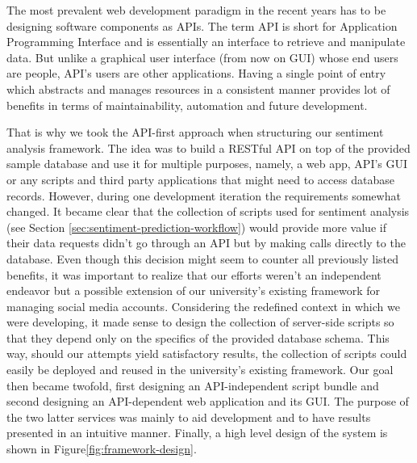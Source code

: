 The most prevalent web development paradigm in the recent years has to be designing software components as APIs. 
The term API is short for Application Programming Interface and is essentially an interface to retrieve and manipulate data. But unlike a graphical user interface (from now on GUI) whose end users are people, API's users are other applications. 
Having a single point of entry which abstracts and manages resources in a consistent manner provides lot of benefits in terms of maintainability, automation and future development.

That is why we took the API-first approach when structuring our sentiment analysis framework. 
The idea was to build a RESTful API on top of the provided sample database and use it for multiple purposes, namely, a web app, API's GUI or any scripts and third party applications that might need to access database records. 
However, during one development iteration the requirements somewhat changed.
It became clear that the collection of scripts used for sentiment analysis (see Section \ref{sec:sentiment-prediction-workflow}) would provide more value if their data requests didn't go through an API but by making calls directly to the database. 
Even though this decision might seem to counter all previously listed benefits, it was important to realize that our efforts weren't an independent endeavor but a possible extension of our university's existing framework for managing social media accounts. 
Considering the redefined context in which we were developing, it made sense to design the collection of server-side scripts so that they depend only on the specifics of the provided database schema.
This way, should our attempts yield satisfactory results, the collection of scripts could easily be deployed and reused in the university's existing framework. 
Our goal then became twofold, first designing an API-independent script bundle and second designing an API-dependent web application and its GUI. 
The purpose of the two latter services was mainly to aid development and to have results presented in an intuitive manner.
Finally, a high level design of the system is shown in Figure\ref{fig:framework-design}.


